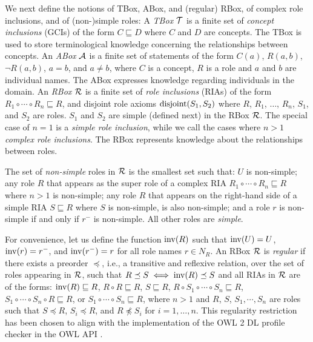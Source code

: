 We next define the notions of TBox, ABox, and (regular) RBox, of complex role inclusions, and of (non-)simple roles:
A \emph{TBox} $\mathcal{T}$ is a finite set of \emph{concept inclusions} (GCIs) of the form $C \sqsubseteq D$ where $C$ and $D$ are concepts. The TBox is used to store terminological knowledge concerning the relationships between concepts. 
%
An \emph{ABox} $\mathcal{A}$ is a finite set of statements of the form $C(a)$, $R(a,b)$, $\lnot R (a,b)$, $a = b$, and $a \not= b$, where $C$ is a concept, $R$ is a role and $a$ and $b$ are individual names. The ABox expresses knowledge regarding individuals in the domain. 
%
An \emph{RBox} $\mathcal{R}$ is a finite set of \emph{role inclusions} (RIAs) of the form $R_1 \circ \cdots \circ R_n \sqsubseteq R$, and disjoint role axioms $\operatorname{disjoint}(S_1, S_2)$ where $R$, $R_1$, $\dots$, $R_n$, $S_1$, and $S_2$ are roles. $S_1$ and $S_2$ are simple (defined next) in the RBox $\mathcal{R}$. The special case of $n = 1$ is a \emph{simple role inclusion}, while we call the cases where $n > 1$ \emph{complex role inclusions}. The RBox represents knowledge about the relationships between roles.

The set of \emph{non-simple} roles in $\mathcal{R}$ is the smallest set such that: $U$ is non-simple; any role $R$ that appears as the super role of a complex RIA $R_1 \circ \cdots \circ R_n \sqsubseteq R$ where $n > 1$ is non-simple; any role $R$ that appears on the right-hand side of a simple RIA $S \sqsubseteq R$ where $S$ is non-simple, is also non-simple; and a role $r$ is non-simple if and only if $r^-$ is non-simple.
All other roles are \emph{simple}.

For convenience, let us define the function $\operatorname{inv}(R)$ such that $\operatorname{inv}(U) = U$, $\operatorname{inv}(r) = r^-$, and $\operatorname{inv}(r^-) = r$ for all role names $r \in N_R$. 
%
An RBox $\mathcal{R}$ is \emph{regular} if there exists a preorder $\preceq$, i.e., a transitive and reflexive relation, over the set of roles appearing in $\mathcal{R}$, such that $R \preceq S \iff \operatorname{inv}(R) \preceq S$ and all RIAs in $\mathcal{R}$ are of the forms:
$\operatorname{inv}(R) \sqsubseteq R$,
$R \circ R \sqsubseteq R$,
$S \sqsubseteq R$, $R \circ S_1 \circ \cdots \circ S_n \sqsubseteq R$,
$S_1 \circ \cdots \circ S_n \circ R \sqsubseteq R$, or
$S_1 \circ \cdots \circ S_n \sqsubseteq R$,
where $n > 1$ and $R$, $S$, $S_1, \cdots, S_n$ are roles such that $S \preceq R$, $S_i \preceq R$, and $R \not\preceq S_i$ for $i = 1, \dots, n$. This regularity restriction has been chosen to align with the implementation of the OWL 2 DL \cite{motik2012ontology} profile checker in the OWL API \cite{horridge2011owl}.

